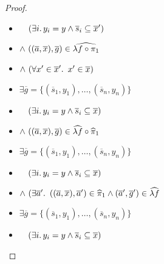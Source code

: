 \begin{prop}
\begin{proof}
\begin{itemize}
      \addtolength{\itemsep}{-.4\baselineskip}
      \item[\phantom{\imps}]
        \quad$\phantom{\land}~(\exists i\ldotp y_i=y\land\overline{s}_i\subseteq\overline{x}^\prime)$

      \item[\phantom{\imps}]
        \quad$\land~((\overline{a},\overline{x}), \overline{g})\in\widehat{\lambda f\circ\pi_1}$

      \item[\phantom{\imps}]
        \quad$\land~(\forall x^\prime\in\overline{x}^\prime\ldotp~x^\prime\in\overline{x})$
      \addtolength{\itemsep}{.4\baselineskip}

      \item[\iffs]
        $\exists\overline{g} = \{(\overline{s}_1,y_1),\ldots,(\overline{s}_n,y_n)\}$

      \addtolength{\itemsep}{-.4\baselineskip}
      \item[\phantom{\imps}]
        \quad$\phantom{\land}~(\exists i\ldotp y_i=y\land\overline{s}_i\subseteq\overline{x})$

      \item[\phantom{\imps}]
        \quad$\land~((\overline{a},\overline{x}), \overline{g})\in\widehat{\lambda f}\circ\widehat{\pi}_1$

      \addtolength{\itemsep}{.4\baselineskip}

      \item[\iffs]
        $\exists\overline{g} = \{(\overline{s}_1,y_1),\ldots,(\overline{s}_n,y_n)\}$

      \addtolength{\itemsep}{-.4\baselineskip}
      \item[\phantom{\imps}]
        \quad$\phantom{\land}~(\exists i\ldotp y_i=y\land\overline{s}_i\subseteq\overline{x})$

      \item[\phantom{\imps}]
        \quad$\land~(\exists\overline{a}^\prime\ldotp~((\overline{a},\overline{x}),\overline{a}^\prime)\in\widehat{\pi}_1\land(\overline{a}^\prime,\overline{g}^\prime)\in\widehat{\lambda f}$

      \addtolength{\itemsep}{.4\baselineskip}

      \item[\iffs]
        $\exists\overline{g} = \{(\overline{s}_1,y_1),\ldots,(\overline{s}_n,y_n)\}$

      \addtolength{\itemsep}{-.4\baselineskip}
      \item[\phantom{\imps}]
        \quad$\phantom{\land}~(\exists i\ldotp y_i=y\land\overline{s}_i\subseteq\overline{x})$


\end{itemize}
\end{proof}
\end{prop}
